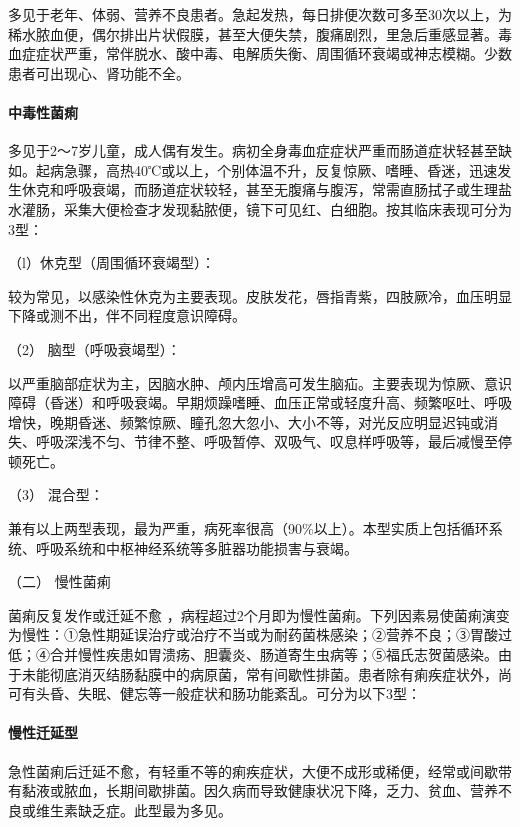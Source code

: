多见于老年、体弱、营养不良患者。急起发热，每日排便次数可多至30次以上，为稀水脓血便，偶尔排出片状假膜，甚至大便失禁，腹痛剧烈，里急后重感显著。毒血症症状严重，常伴脱水、酸中毒、电解质失衡、周围循环衰竭或神志模糊。少数患者可出现心、肾功能不全。

\paragraph{中毒性菌痢}

多见于2～7岁儿童，成人偶有发生。病初全身毒血症症状严重而肠道症状轻甚至缺如。起病急骤，高热40℃或以上，个别体温不升，反复惊厥、嗜睡、昏迷，迅速发生休克和呼吸衰竭，而肠道症状较轻，甚至无腹痛与腹泻，常需直肠拭子或生理盐水灌肠，采集大便检查才发现黏脓便，镜下可见红、白细胞。按其临床表现可分为3型：

\hypertarget{text00227.htmlux5cux23CHP7-9-2-1-1-4-1}{}
（l）休克型（周围循环衰竭型）：

较为常见，以感染性休克为主要表现。皮肤发花，唇指青紫，四肢厥冷，血压明显下降或测不出，伴不同程度意识障碍。

\hypertarget{text00227.htmlux5cux23CHP7-9-2-1-1-4-2}{}
（2） 脑型（呼吸衰竭型）：

以严重脑部症状为主，因脑水肿、颅内压增高可发生脑疝。主要表现为惊厥、意识障碍（昏迷）和呼吸衰竭。早期烦躁嗜睡、血压正常或轻度升高、频繁呕吐、呼吸增快，晚期昏迷、频繁惊厥、瞳孔忽大忽小、大小不等，对光反应明显迟钝或消失、呼吸深浅不匀、节律不整、呼吸暂停、双吸气、叹息样呼吸等，最后减慢至停顿死亡。

\hypertarget{text00227.htmlux5cux23CHP7-9-2-1-1-4-3}{}
（3） 混合型：

兼有以上两型表现，最为严重，病死率很高（90\%以上）。本型实质上包括循环系统、呼吸系统和中枢神经系统等多脏器功能损害与衰竭。

\hypertarget{text00227.htmlux5cux23CHP7-9-2-1-2}{}
（二） 慢性菌痢

菌痢反复发作或迁延不愈
，病程超过2个月即为慢性菌痢。下列因素易使菌痢演变为慢性：①急性期延误治疗或治疗不当或为耐药菌株感染；②营养不良；③胃酸过低；④合并慢性疾患如胃溃疡、胆囊炎、肠道寄生虫病等；⑤福氏志贺菌感染。由于未能彻底消灭结肠黏膜中的病原菌，常有间歇性排菌。患者除有痢疾症状外，尚可有头昏、失眠、健忘等一般症状和肠功能紊乱。可分为以下3型：

\paragraph{慢性迁延型}

急性菌痢后迁延不愈，有轻重不等的痢疾症状，大便不成形或稀便，经常或间歇带有黏液或脓血，长期间歇排菌。因久病而导致健康状况下降，乏力、贫血、营养不良或维生素缺乏症。此型最为多见。

